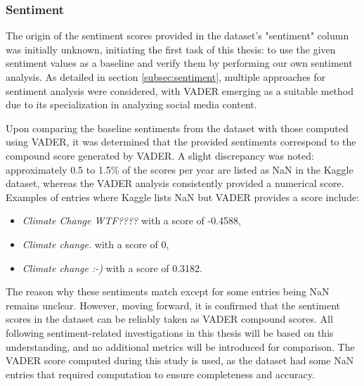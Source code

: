 \subsubsection{Sentiment}
The origin of the sentiment scores provided in the dataset's "sentiment" column was initially unknown, initiating the first task of this thesis: to use the given sentiment values as a baseline and verify them by performing our own sentiment analysis. As detailed in section \ref{subsec:sentiment}, multiple approaches for sentiment analysis were considered, with VADER emerging as a suitable method due to its specialization in analyzing social media content.

Upon comparing the baseline sentiments from the dataset with those computed using VADER, it was determined that the provided sentiments correspond to the compound score generated by VADER. A slight discrepancy was noted: approximately 0.5 to 1.5\% of the scores per year are listed as NaN in the Kaggle dataset, whereas the VADER analysis consistently provided a numerical score. Examples of entries where Kaggle lists NaN but VADER provides a score include:
\begin{itemize}
    \item \emph{Climate Change WTF????} with a score of -0.4588,
    \item \emph{Climate change.} with a score of 0,
    \item \emph{Climate change :-)} with a score of 0.3182.
\end{itemize}
The reason why these sentiments match except for some entries being NaN remains unclear. However, moving forward, it is confirmed that the sentiment scores in the dataset can be reliably taken as VADER compound scores. All following sentiment-related investigations in this thesis will be based on this understanding, and no additional metrics will be introduced for comparison. The VADER score computed during this study is used, as the dataset had some NaN entries that required computation to ensure completeness and accuracy.